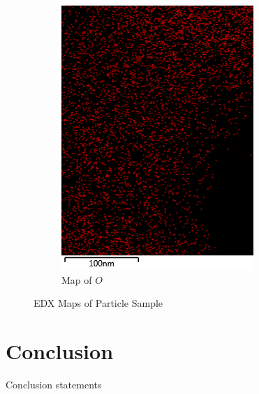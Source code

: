 \documentclass[12pt,a4paper]{article}
\begin{document}
\begin{figure}
\begin{subfigure}[b]{0.35\textwidth}
    \includegraphics[width=\textwidth]{Data/O Map.png}
    \caption{Map of $O$}
    \label{fig:o_map}
  \end{subfigure}
  \caption{EDX Maps of Particle Sample}\label{fig:map_grid}
\end{figure}



\section{Conclusion} %


Conclusion statements


 
 \nocite{*}
\end{document}
